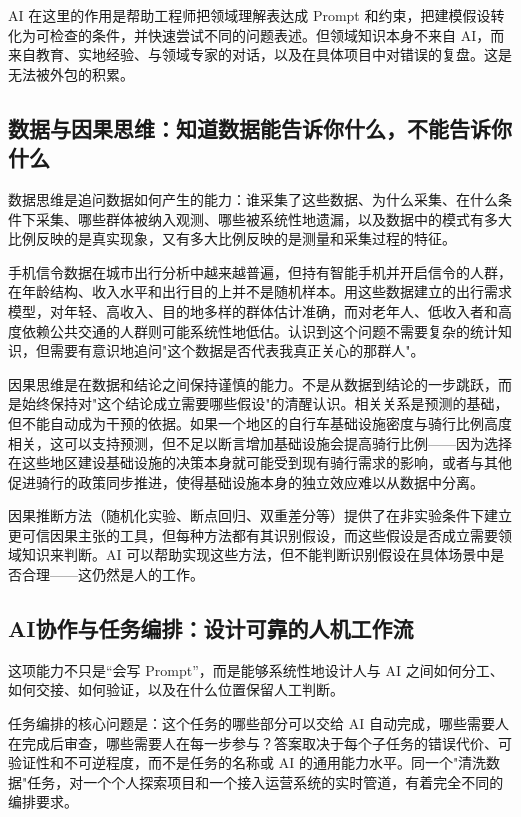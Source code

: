 AI 在这里的作用是帮助工程师把领域理解表达成 Prompt 和约束，把建模假设转化为可检查的条件，并快速尝试不同的问题表述。但领域知识本身不来自 AI，而来自教育、实地经验、与领域专家的对话，以及在具体项目中对错误的复盘。这是无法被外包的积累。

\subsection{数据与因果思维：知道数据能告诉你什么，不能告诉你什么}

数据思维是追问数据如何产生的能力：谁采集了这些数据、为什么采集、在什么条件下采集、哪些群体被纳入观测、哪些被系统性地遗漏，以及数据中的模式有多大比例反映的是真实现象，又有多大比例反映的是测量和采集过程的特征。

手机信令数据在城市出行分析中越来越普遍，但持有智能手机并开启信令的人群，在年龄结构、收入水平和出行目的上并不是随机样本。用这些数据建立的出行需求模型，对年轻、高收入、目的地多样的群体估计准确，而对老年人、低收入者和高度依赖公共交通的人群则可能系统性地低估。认识到这个问题不需要复杂的统计知识，但需要有意识地追问"这个数据是否代表我真正关心的那群人"。

因果思维是在数据和结论之间保持谨慎的能力。不是从数据到结论的一步跳跃，而是始终保持对"这个结论成立需要哪些假设"的清醒认识。相关关系是预测的基础，但不能自动成为干预的依据。如果一个地区的自行车基础设施密度与骑行比例高度相关，这可以支持预测，但不足以断言增加基础设施会提高骑行比例——因为选择在这些地区建设基础设施的决策本身就可能受到现有骑行需求的影响，或者与其他促进骑行的政策同步推进，使得基础设施本身的独立效应难以从数据中分离。

因果推断方法（随机化实验、断点回归、双重差分等）提供了在非实验条件下建立更可信因果主张的工具，但每种方法都有其识别假设，而这些假设是否成立需要领域知识来判断\cite{hernan2020causal}。AI 可以帮助实现这些方法，但不能判断识别假设在具体场景中是否合理——这仍然是人的工作。

\subsection{AI协作与任务编排：设计可靠的人机工作流}

这项能力不只是“会写 Prompt”，而是能够系统性地设计人与 AI 之间如何分工、如何交接、如何验证，以及在什么位置保留人工判断。

任务编排的核心问题是：这个任务的哪些部分可以交给 AI 自动完成，哪些需要人在完成后审查，哪些需要人在每一步参与？答案取决于每个子任务的错误代价、可验证性和不可逆程度，而不是任务的名称或 AI 的通用能力水平。同一个"清洗数据"任务，对一个个人探索项目和一个接入运营系统的实时管道，有着完全不同的编排要求。

